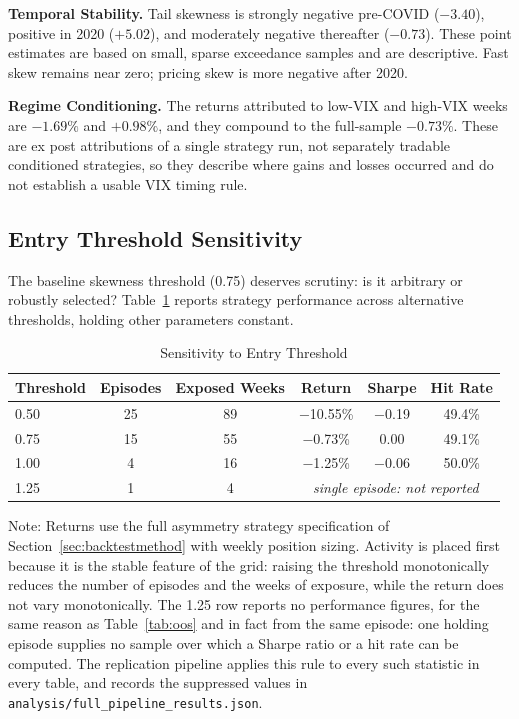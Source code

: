 \documentclass[11pt]{article}
\begin{document}
\textbf{Temporal Stability.} Tail skewness is strongly negative pre-COVID ($-3.40$), positive in 2020 ($+5.02$), and moderately negative thereafter ($-0.73$). These point estimates are based on small, sparse exceedance samples and are descriptive. Fast skew remains near zero; pricing skew is more negative after 2020.

\textbf{Regime Conditioning.} The returns attributed to low-VIX and high-VIX weeks are $-1.69\%$ and $+0.98\%$, and they compound to the full-sample $-0.73\%$. These are ex post attributions of a single strategy run, not separately tradable conditioned strategies, so they describe where gains and losses occurred and do not establish a usable VIX timing rule.

\subsection{Entry Threshold Sensitivity}

The baseline skewness threshold (0.75) deserves scrutiny: is it arbitrary or robustly selected? Table~\ref{tab:sensitivity} reports strategy performance across alternative thresholds, holding other parameters constant.

\begin{table}[H]
\centering
\caption{Sensitivity to Entry Threshold}
\label{tab:sensitivity}
\small
\begin{tabular}{@{}lccccc@{}}
\toprule
Threshold & Episodes & Exposed Weeks & Return & Sharpe & Hit Rate \\
\midrule
0.50 & 25 & 89 & $-$10.55\% & $-$0.19 & 49.4\% \\
0.75 & 15 & 55 & $-$0.73\% & 0.00 & 49.1\% \\
1.00 & 4 & 16 & $-$1.25\% & $-$0.06 & 50.0\% \\
1.25 & 1 & 4 & \multicolumn{3}{c}{\emph{single episode: not reported}} \\
\bottomrule
\end{tabular}
\par\vspace{0.3em}
\parbox{\linewidth}{\footnotesize Note: Returns use the full asymmetry strategy specification of Section~\ref{sec:backtestmethod} with weekly position sizing. Activity is placed first because it is the stable feature of the grid: raising the threshold monotonically reduces the number of episodes and the weeks of exposure, while the return does not vary monotonically. The 1.25 row reports no performance figures, for the same reason as Table~\ref{tab:oos} and in fact from the same episode: one holding episode supplies no sample over which a Sharpe ratio or a hit rate can be computed. The replication pipeline applies this rule to every such statistic in every table, and records the suppressed values in \texttt{analysis/full\_pipeline\_results.json}.}
\end{table}
\end{document}
